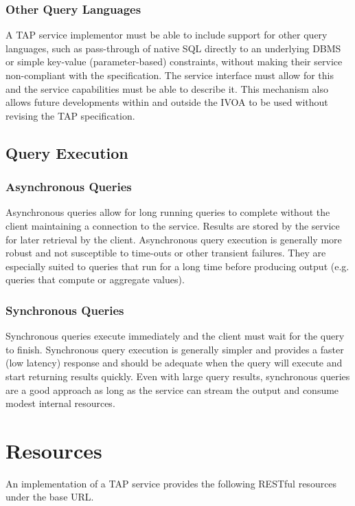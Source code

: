 \documentclass[11pt,letter]{ivoa}
\begin{document}
\subsubsection{Other Query Languages}
A TAP service implementor must be able to include support for other query languages, such as
pass-through of native SQL directly to an underlying DBMS or simple key-value 
(parameter-based) constraints, without making their service non-compliant with the specification. The service interface must allow for 
this and the service capabilities must be able to describe it. This mechanism 
also allows future developments within and outside the IVOA to be used without 
revising the TAP specification.

\subsection{Query Execution}

\subsubsection{Asynchronous Queries}
Asynchronous queries allow for long running queries to complete without 
the client maintaining a connection to the service. Results are stored by 
the service for later retrieval by the client. Asynchronous query 
execution is generally more robust and not susceptible to time-outs or other 
transient failures. They are especially suited to queries that run for a long 
time before producing output (e.g. queries that compute or aggregate values).

\subsubsection{Synchronous Queries}
Synchronous queries execute immediately  and the client must wait for the query 
to finish. Synchronous query execution is generally simpler and provides a 
faster (low latency) response and should be adequate when the query will execute 
and start returning results quickly. Even with large query results, synchronous 
queries are a good approach as long as the service can stream the output 
and consume modest internal resources. 

\section{Resources}
\label{sec:resources}

An implementation of a TAP service provides the following RESTful resources 
under the base URL.
\end{document}
